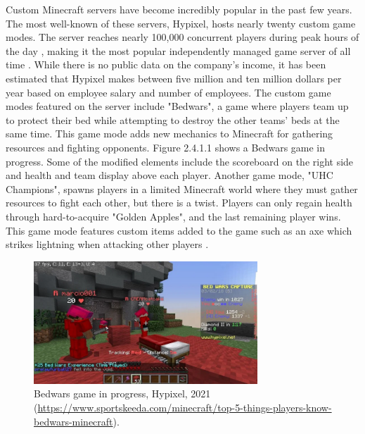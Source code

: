 \documentclass[12pt]{article}
\begin{document}
\begin{onehalfspacing}
Custom Minecraft servers have become incredibly popular in the past few
years. The most well-known of these servers, Hypixel, hosts nearly
twenty custom game modes. The server reaches nearly 100,000 concurrent
players during peak hours of the day \parencite{minecraftservers}, making
it the most popular independently managed game server of all time
\parencite{guinnessindependentserver}. While there is no public data on the
company's income, it has been estimated that Hypixel makes between five
million and ten million dollars per year based on employee salary and
number of employees. The custom game modes featured on the server
include "Bedwars", a game where players team up to protect their bed
while attempting to destroy the other teams' beds at the same time. This
game mode adds new mechanics to Minecraft for gathering resources and
fighting opponents. Figure 2.4.1.1 shows a Bedwars game in progress.
Some of the modified elements include the scoreboard on the right side
and health and team display above each player. Another game mode, "UHC
Champions", spawns players in a limited Minecraft world where they must
gather resources to fight each other, but there is a twist. Players can
only regain health through hard-to-acquire "Golden Apples", and the last
remaining player wins. This game mode features custom items added to the
game such as an axe which strikes lightning when attacking other players
\parencite{hypixelgames}.

\begin{figure}[h] 
    \centering
    \includegraphics[width=0.75\textwidth]{media/media/image5.png} 
    \caption{Bedwars game in progress, Hypixel, 2021 \\ (\url{https://www.sportskeeda.com/minecraft/top-5-things-players-know-bedwars-minecraft}).
} 
    \label{fig:2_4_1_1} 
\end{figure}



\end{onehalfspacing}
\end{document}
